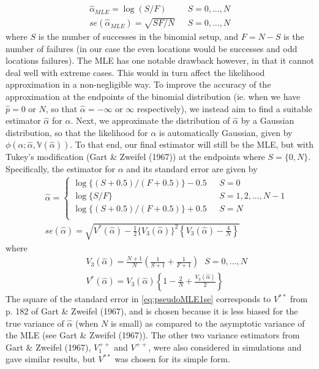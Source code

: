\documentclass[12pt]{article}
\newcommand{\Ga}{\alpha}
\begin{document}
\begin{eqnarray}
\hat{\Ga}_{MLE}=\log(S/F)&\ \ \ S=0,...,N\\
se(\hat{\Ga}_{MLE})=\sqrt{SF/N}&\ \ \ S=0,...,N
\end{eqnarray}
where $S$ is the number of successes in the binomial setup, and $F=N-S$ is the number of failures (in our case the even locations would be successes and odd locations failures). The MLE has one notable drawback however, in that it cannot deal well with extreme cases. This would in turn affect the likelihood approximation in a non-negligible way. To improve the accuracy of the approximation at the endpoints of the binomial distribution (ie. when we have $\hat{p}=0$ or $N$, so that $\hat{\Ga}=-\infty$ or $\infty$ respectively), we instead aim to find a suitable estimator $\hat{\Ga}$ for $\Ga$. Next, we approximate the distribution of $\hat{\Ga}$ by a Gaussian distribution, so that the likelihood for $\Ga$ is automatically Gaussian, given by $\phi(\Ga;\hat{\Ga},\mathbb{V}(\hat{\Ga}))$. To that end, our final estimator will still be the MLE, but with Tukey's modification (Gart \& Zweifel (1967)) at the endpoints where $S=\{0,N\}$. Specifically, the estimator for $\Ga$ and its standard error are given by
\begin{eqnarray}\label{eq:pseudoMLE1}
&&\hat{\Ga}=\left\{
\begin{array}{lll}
\log\{(S+0.5)/(F+0.5)\}-0.5&\ \ \ S=0\\
\log\{S/F\}&\ \ \ S=1,2,...,N-1\\
\log\{(S+0.5)/(F+0.5)\}+0.5&\ \ \ S=N\\
\end{array}
\right.\\ \label{eq:pseudoMLE1se}
&&se(\hat{\Ga})=\sqrt{V^*(\hat{\Ga})-\frac{1}{2}\{V_3(\hat{\Ga})\}^2\left\{V_3(\hat{\Ga})-\frac{4}{N}\right\}}
\end{eqnarray}
where
\begin{eqnarray}
&&V_3(\hat{\Ga})=\frac{N+1}{N}\left(\frac{1}{S+1}+\frac{1}{F+1}\right)\ \ \ S=0,...,N\\
\label{eq:pseudoMLE2}&&V^*(\hat{\Ga})=V_3(\hat{\Ga})\left\{1-\frac{2}{N}+\frac{V_3(\hat{\Ga})}{2}\right\}
\end{eqnarray}
The square of the standard error in \eqref{eq:pseudoMLE1se} corresponds to $V^{\ast\ast}$ from p. 182 of Gart \& Zweifel (1967), and is chosen because it is less biased for the true variance of $\hat{\Ga}$ (when $N$ is small) as compared to the asymptotic variance of the MLE (see Gart \& Zweifel (1967)). The other two variance estimators from Gart \& Zweifel (1967), $V_1^{++}$ and $V^{++}$, were also considered in simulations and gave similar results, but $V^{\ast\ast}$ was chosen for its simple form.
\end{document}
